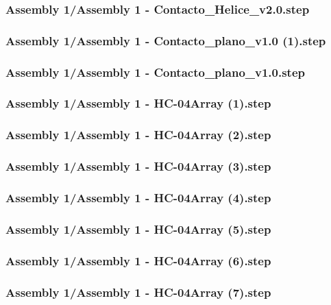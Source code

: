 \documentclass[a4paper,12pt]{article}
\begin{document}
\begin{lstlising}[language=C++]
\subsubsection{Assembly 1/Assembly 1 - Contacto_Helice_v2.0.step}

\subsubsection{Assembly 1/Assembly 1 - Contacto_plano_v1.0 (1).step}

\subsubsection{Assembly 1/Assembly 1 - Contacto_plano_v1.0.step}

\subsubsection{Assembly 1/Assembly 1 - HC-04Array (1).step}

\subsubsection{Assembly 1/Assembly 1 - HC-04Array (2).step}

\subsubsection{Assembly 1/Assembly 1 - HC-04Array (3).step}

\subsubsection{Assembly 1/Assembly 1 - HC-04Array (4).step}

\subsubsection{Assembly 1/Assembly 1 - HC-04Array (5).step}

\subsubsection{Assembly 1/Assembly 1 - HC-04Array (6).step}

\subsubsection{Assembly 1/Assembly 1 - HC-04Array (7).step}


\end{lstlising}
\end{document}
